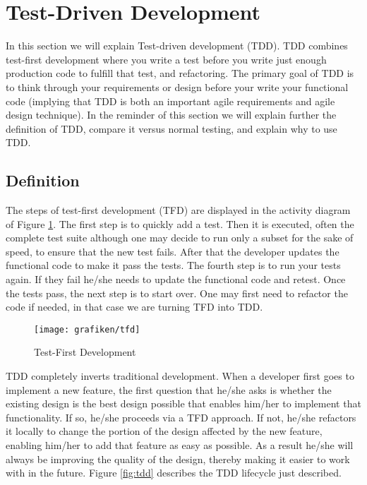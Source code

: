 \section{Test-Driven Development}
In this section we will explain Test-driven development (TDD). TDD combines test-first development where you write a test before you write just enough production code to fulfill that test, and refactoring. The primary goal of TDD is to think through your requirements or design before your write your functional code (implying that TDD is both an important agile requirements and agile design technique). In the reminder of this section we will explain further the definition of TDD, compare it versus normal testing, and explain why to use TDD.

\subsection{Definition}
The steps of test-first development (TFD) are displayed in the activity diagram of Figure \ref{fig:tfd}. The first step is to quickly add a test. Then it is executed, often the complete test suite although one may decide to run only a subset for the sake of speed, to ensure that the new test fails. After that the developer updates the functional code to make it pass the tests. The fourth step is to run your tests again. If they fail he/she needs to update the functional code and retest. Once the tests pass, the next step is to start over. One may first need to refactor the code if needed, in that case we are turning TFD into TDD.

\begin{figure}[H]
	\centering
    \texttt{[image: grafiken/tfd]}
    \caption{Test-First Development}
    \label{fig:tfd}
\end{figure}

TDD completely inverts traditional development. When a developer first goes to implement a new feature, the first question that he/she asks is whether the existing design is the best design possible that enables him/her to implement that functionality. If so, he/she proceeds via a TFD approach. If not, he/she refactors it locally to change the portion of the design affected by the new feature, enabling him/her to add that feature as easy as possible. As a result he/she will always be improving the quality of the design, thereby making it easier to work with in the future. Figure \ref{fig:tdd} describes the TDD lifecycle just described.

